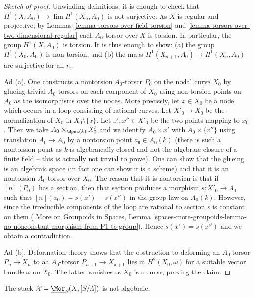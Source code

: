 \begin{proof}[Sketch of proof]
Unwinding definitions, it is enough to check that
$H^1(X, A_0) \to \lim H^1(X_n, A_0)$ is not surjective.
As $X$ is regular and projective, by
Lemmas \ref{lemma-torsors-over-field-torsion} and
\ref{lemma-torsors-over-two-dimensional-regular}
each $A_0$-torsor over $X$ is torsion.
In particular, the group $H^1(X, A_0)$ is torsion.
It is thus enough to show:
(a) the group $H^1(X_0, A_0)$ is non-torsion, and
(b) the maps $H^1(X_{n + 1}, A_0) \to H^1(X_n, A_0)$ are surjective for all $n$.

\medskip\noindent
Ad (a). One constructs a nontorsion $A_0$-torsor $P_0$ on the nodal
curve $X_0$ by glueing trivial $A_0$-torsors on each component
of $X_0$ using non-torsion points on $A_0$ as the isomorphisms
over the nodes. More precisely, let $x \in X_0$ be a node
which occurs in a loop consisting of rational curves.
Let $X'_0 \to X_0$ be the normalization of $X_0$ in $X_0 \setminus \{x\}$.
Let $x', x'' \in X'_0$ be the two points mapping to $x_0$.
Then we take $A_0 \times_{\Spec(k)} X'_0$ and we identify
$A_0 \times {x'}$ with $A_0 \times \{x''\}$ using translation
$A_0 \to A_0$ by a nontorsion point $a_0 \in A_0(k)$ (there is such
a nontorsion point as $k$ is algebraically closed and not the algebraic
closure of a finite field -- this is actually not trivial to prove).
One can show that the glueing is an algebraic space (in fact one can
show it is a scheme) and that it is an nontorsion $A_0$-torsor over $X_0$.
The reason that it is nontorsion is that if $[n](P_0)$ has a section,
then that section produces a morphism $s : X'_0 \to A_0$ such that
$[n](a_0) = s(x') - s(x'')$ in the group law on $A_0(k)$. However,
since the irreducible components of the loop are rational to
section $s$ is constant on them (
More on Groupoids in Spaces, Lemma
\ref{spaces-more-groupoids-lemma-no-nonconstant-morphism-from-P1-to-group}).
Hence $s(x') = s(x'')$ and we obtain a contradiction.

\medskip\noindent
Ad (b). Deformation theory shows that the obstruction to deforming an
$A_0$-torsor $P_n \to X_n$ to an $A_0$-torsor $P_{n + 1} \to X_{n + 1}$
lies in $H^2(X_0, \omega)$ for a suitable vector bundle $\omega$ on $X_0$.
The latter vanishes as $X_0$ is a curve, proving the claim.
\end{proof}

\begin{proposition}
\label{proposition-nonalghomstack}
The stack $\mathcal{X} = \underline{\Mor}_S(X, [S/A])$ is not algebraic.
\end{proposition}


